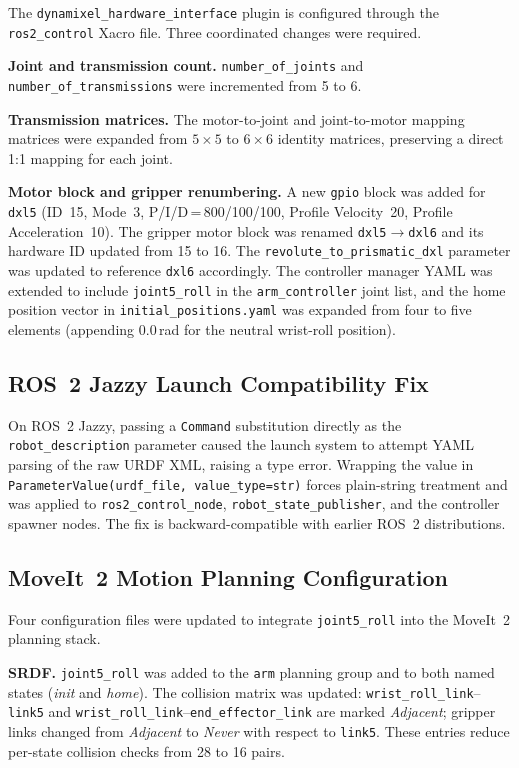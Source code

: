 \documentclass[conference]{IEEEtran}
\begin{document}
	The \texttt{dynamixel\_hardware\_interface} plugin is configured
	through the \texttt{ros2\_control} Xacro file. Three coordinated
	changes were required.
	
	\textbf{Joint and transmission count.}
	\texttt{number\_of\_joints} and \texttt{number\_of\_transmissions}
	were incremented from 5 to 6.
	
	\textbf{Transmission matrices.}
	The motor-to-joint and joint-to-motor mapping matrices were expanded
	from $5\!\times\!5$ to $6\!\times\!6$ identity matrices, preserving a
	direct 1:1 mapping for each joint.
	
	\textbf{Motor block and gripper renumbering.}
	A new \texttt{gpio} block was added for \texttt{dxl5} (ID~15, Mode~3,
	P/I/D\,=\,800/100/100, Profile Velocity~20, Profile Acceleration~10).
	The gripper motor block was renamed \texttt{dxl5}$\rightarrow$\texttt{dxl6}
	and its hardware ID updated from 15 to 16. The
	\texttt{revolute\_to\_prismatic\_dxl} parameter was updated to
	reference \texttt{dxl6} accordingly. The controller manager YAML was
	extended to include \texttt{joint5\_roll} in the
	\texttt{arm\_controller} joint list, and the home position vector in
	\texttt{initial\_positions.yaml} was expanded from four to five
	elements (appending 0.0\,rad for the neutral wrist-roll position).
	
	\subsection{ROS~2 Jazzy Launch Compatibility Fix}
	
	On ROS~2 Jazzy, passing a \texttt{Command} substitution directly as
	the \texttt{robot\_description} parameter caused the launch system to
	attempt YAML parsing of the raw URDF XML, raising a type error.
	Wrapping the value in \texttt{ParameterValue(urdf\_file,
		value\_type=str)} forces plain-string treatment and was applied to
	\texttt{ros2\_control\_node}, \texttt{robot\_state\_publisher}, and
	the controller spawner nodes. The fix is backward-compatible with
	earlier ROS~2 distributions.
	
	\subsection{MoveIt~2 Motion Planning Configuration}
	
	Four configuration files were updated to integrate
	\texttt{joint5\_roll} into the MoveIt~2 planning stack.
	
	\textbf{SRDF.}
	\texttt{joint5\_roll} was added to the \texttt{arm} planning group
	and to both named states (\textit{init} and \textit{home}). The
	collision matrix was updated: \texttt{wrist\_roll\_link}--\texttt{link5}
	and \texttt{wrist\_roll\_link}--\texttt{end\_effector\_link} are
	marked \textit{Adjacent}; gripper links changed from \textit{Adjacent}
	to \textit{Never} with respect to \texttt{link5}. These entries reduce
	per-state collision checks from 28 to 16 pairs.
	
\end{document}

